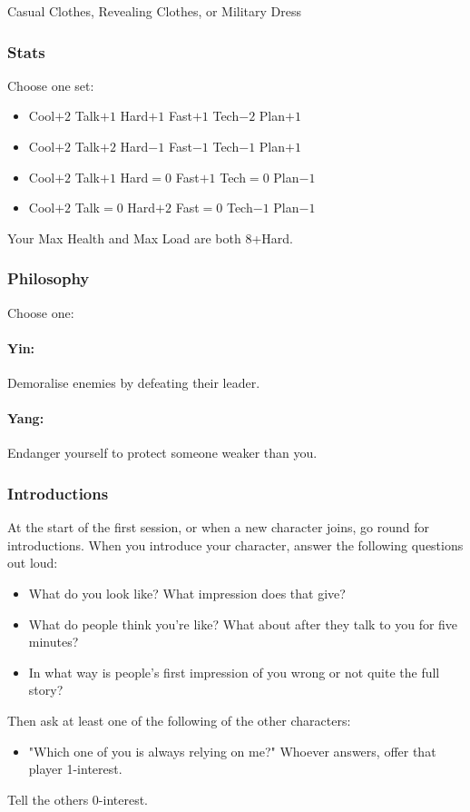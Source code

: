 Casual Clothes, Revealing Clothes, or Military Dress

\subsubsection{Stats}
Choose one set:
\begin{itemize}
\setlength\itemsep{0em}
\item Cool$+2$ Talk$+1$ Hard$+1$ Fast$+1$ Tech$-2$ Plan$+1$
\item Cool$+2$ Talk$+2$ Hard$-1$ Fast$-1$ Tech$-1$ Plan$+1$
\item Cool$+2$ Talk$+1$ Hard${=}0$ Fast$+1$ Tech${=}0$ Plan$-1$
\item Cool$+2$ Talk${=}0$ Hard$+2$ Fast${=}0$ Tech$-1$ Plan$-1$
\end{itemize}

Your Max Health and Max Load are both 8+Hard.

\subsubsection{Philosophy}
Choose one:
\paragraph{Yin:} Demoralise enemies by defeating their leader.
\paragraph{Yang:} Endanger yourself to protect someone weaker than you.

\subsubsection{Introductions}
At the start of the first session, or when a new character joins, go round for introductions.
When you introduce your character, answer the following questions out loud:
\begin{itemize}
\item What do you look like? What impression does that give?
\item What do people think you're like? What about after they talk to you for five minutes?
\item In what way is people's first impression of you wrong or not quite the full story?
\end{itemize}

Then ask at least one of the following of the other characters:
\begin{itemize}
\item "Which one of you is always relying on me?" Whoever answers, offer that player 1-interest.
\end{itemize}
Tell the others 0-interest.

